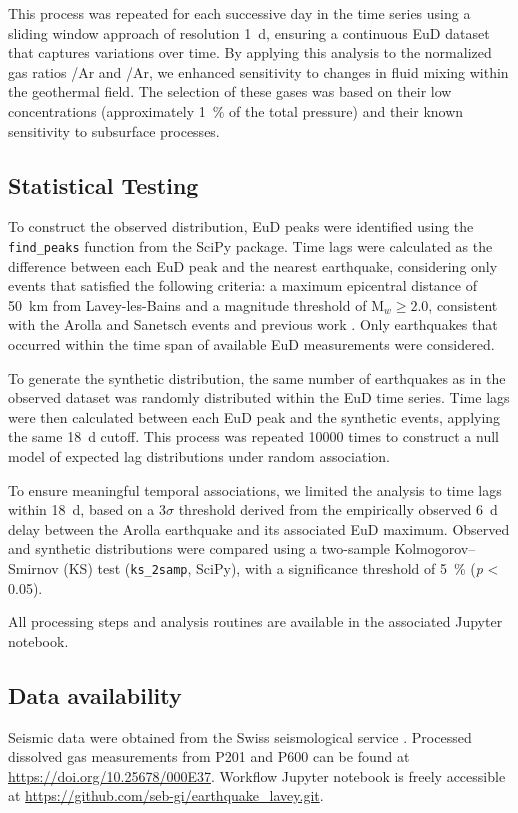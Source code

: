 This process was repeated for each successive day in the time series using a sliding window approach of resolution \SI{1}{\day}, ensuring a continuous EuD dataset that captures variations over time.
By applying this analysis to the normalized gas ratios /Ar and /Ar, we enhanced sensitivity to changes in fluid mixing within the geothermal field.
The selection of these gases was based on their low concentrations (approximately \SI{1}{\percent} of the total pressure) and their known sensitivity to subsurface processes.

\subsection{Statistical Testing}\label{methods:stats}
To construct the observed distribution, EuD peaks were identified using the \texttt{find\_peaks} function from the SciPy package.
Time lags were calculated as the difference between each EuD peak and the nearest earthquake, considering only events that satisfied the following criteria: a maximum epicentral distance of \SI{50}{\kilo\meter} from Lavey-les-Bains and a magnitude threshold of M$_w \geq 2.0$, consistent with the Arolla and Sanetsch events and previous work \citep{chiodini2020co2}.
Only earthquakes that occurred within the time span of available EuD measurements were considered.

To generate the synthetic distribution, the same number of earthquakes as in the observed dataset was randomly distributed within the EuD time series.
Time lags were then calculated between each EuD peak and the synthetic events, applying the same \SI{18}{\day} cutoff.
This process was repeated \num{10000} times to construct a null model of expected lag distributions under random association.

To ensure meaningful temporal associations, we limited the analysis to time lags within \SI{18}{\day}, based on a 3$\sigma$ threshold derived from the empirically observed \SI{6}{\day} delay between the Arolla earthquake and its associated EuD maximum.
Observed and synthetic distributions were compared using a two-sample Kolmogorov–Smirnov (KS) test (\texttt{ks\_2samp}, SciPy), with a significance threshold of \SI{5}{\percent} (\textit{p} < 0.05).

All processing steps and analysis routines are available in the associated Jupyter notebook.

\subsection{Data availability}
Seismic data were obtained from the Swiss seismological service \citep{sed2025earthquakes}.
Processed dissolved gas measurements from P201 and P600 can be found at \url{https://doi.org/10.25678/000E37}.
Workflow Jupyter notebook is freely accessible at \url{https://github.com/seb-gi/earthquake_lavey.git}.